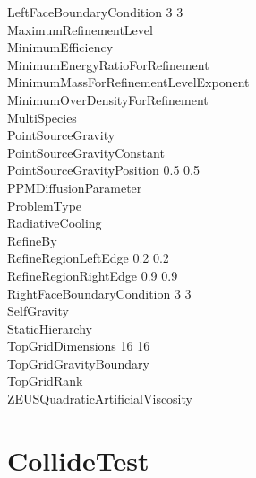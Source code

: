 \documentclass{book}
\begin{document}
{\begin{tabbing}
\> LeftFaceBoundaryCondition   3 3    \\
\> MaximumRefinementLevel         \\
\> MinimumEfficiency            \\
\> MinimumEnergyRatioForRefinement   \\
\> MinimumMassForRefinementLevelExponent  \\
\> MinimumOverDensityForRefinement   \\
\> MultiSpecies                 \\
\> PointSourceGravity          \\
\> PointSourceGravityConstant  \\
\> PointSourceGravityPosition  0.5 0.5 \\
\> PPMDiffusionParameter               \\
\> ProblemType                       \\
\> RadiativeCooling             \\
\> RefineBy                       \\
\> RefineRegionLeftEdge             0.2 0.2 \\
\> RefineRegionRightEdge            0.9 0.9 \\
\> RightFaceBoundaryCondition  3 3 \\
\> SelfGravity                        \\
\> StaticHierarchy                \\
\> TopGridDimensions           16 16 \\
\> TopGridGravityBoundary             \\
\> TopGridRank                 \\
\> ZEUSQuadraticArtificialViscosity 
\end{tabbing}}

\subsection{\cello}

\section{CollideTest} \label{s:CollideTest}
\end{document}
